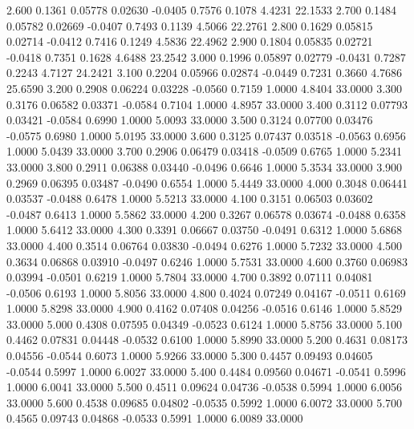    2.600   0.1361   0.05778   0.02630  -0.0405   0.7576   0.1078   4.4231  22.1533
   2.700   0.1484   0.05782   0.02669  -0.0407   0.7493   0.1139   4.5066  22.2761
   2.800   0.1629   0.05815   0.02714  -0.0412   0.7416   0.1249   4.5836  22.4962
   2.900   0.1804   0.05835   0.02721  -0.0418   0.7351   0.1628   4.6488  23.2542
   3.000   0.1996   0.05897   0.02779  -0.0431   0.7287   0.2243   4.7127  24.2421
   3.100   0.2204   0.05966   0.02874  -0.0449   0.7231   0.3660   4.7686  25.6590
   3.200   0.2908   0.06224   0.03228  -0.0560   0.7159   1.0000   4.8404  33.0000
   3.300   0.3176   0.06582   0.03371  -0.0584   0.7104   1.0000   4.8957  33.0000
   3.400   0.3112   0.07793   0.03421  -0.0584   0.6990   1.0000   5.0093  33.0000
   3.500   0.3124   0.07700   0.03476  -0.0575   0.6980   1.0000   5.0195  33.0000
   3.600   0.3125   0.07437   0.03518  -0.0563   0.6956   1.0000   5.0439  33.0000
   3.700   0.2906   0.06479   0.03418  -0.0509   0.6765   1.0000   5.2341  33.0000
   3.800   0.2911   0.06388   0.03440  -0.0496   0.6646   1.0000   5.3534  33.0000
   3.900   0.2969   0.06395   0.03487  -0.0490   0.6554   1.0000   5.4449  33.0000
   4.000   0.3048   0.06441   0.03537  -0.0488   0.6478   1.0000   5.5213  33.0000
   4.100   0.3151   0.06503   0.03602  -0.0487   0.6413   1.0000   5.5862  33.0000
   4.200   0.3267   0.06578   0.03674  -0.0488   0.6358   1.0000   5.6412  33.0000
   4.300   0.3391   0.06667   0.03750  -0.0491   0.6312   1.0000   5.6868  33.0000
   4.400   0.3514   0.06764   0.03830  -0.0494   0.6276   1.0000   5.7232  33.0000
   4.500   0.3634   0.06868   0.03910  -0.0497   0.6246   1.0000   5.7531  33.0000
   4.600   0.3760   0.06983   0.03994  -0.0501   0.6219   1.0000   5.7804  33.0000
   4.700   0.3892   0.07111   0.04081  -0.0506   0.6193   1.0000   5.8056  33.0000
   4.800   0.4024   0.07249   0.04167  -0.0511   0.6169   1.0000   5.8298  33.0000
   4.900   0.4162   0.07408   0.04256  -0.0516   0.6146   1.0000   5.8529  33.0000
   5.000   0.4308   0.07595   0.04349  -0.0523   0.6124   1.0000   5.8756  33.0000
   5.100   0.4462   0.07831   0.04448  -0.0532   0.6100   1.0000   5.8990  33.0000
   5.200   0.4631   0.08173   0.04556  -0.0544   0.6073   1.0000   5.9266  33.0000
   5.300   0.4457   0.09493   0.04605  -0.0544   0.5997   1.0000   6.0027  33.0000
   5.400   0.4484   0.09560   0.04671  -0.0541   0.5996   1.0000   6.0041  33.0000
   5.500   0.4511   0.09624   0.04736  -0.0538   0.5994   1.0000   6.0056  33.0000
   5.600   0.4538   0.09685   0.04802  -0.0535   0.5992   1.0000   6.0072  33.0000
   5.700   0.4565   0.09743   0.04868  -0.0533   0.5991   1.0000   6.0089  33.0000
